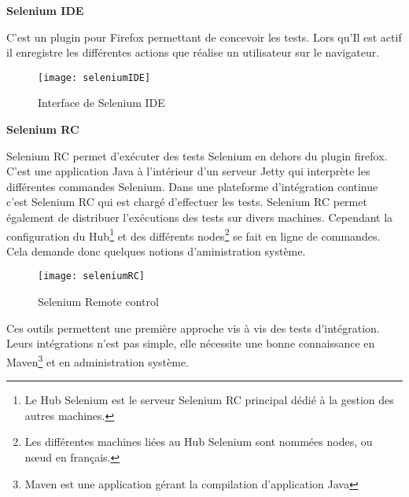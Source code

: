\textbf{Selenium IDE}

		C'est un plugin pour Firefox permettant de concevoir les tests. Lors qu'Il est actif il enregistre
		les différentes actions que réalise un utilisateur sur le navigateur.
		\begin{figure}[!h]
     		\begin{center}
			      \texttt{[image: seleniumIDE]}
			      \caption{Interface de Selenium IDE}
			      \label{seleniumIDE}
		    \end{center}
		\end{figure}		
		

\newpage
\textbf{Selenium RC}

		Selenium RC permet d'exécuter des tests Selenium en dehors du plugin firefox. C'est une
		application Java à l'intérieur d'un serveur Jetty qui interprète les différentes commandes Selenium.
		Dans une plateforme d'intégration continue c'est Selenium RC qui est chargé d'effectuer les tests.
		Selenium RC permet également de distribuer l'exécutions des tests sur divers machines. Cependant
		la configuration du Hub\footnote{Le Hub Selenium est le serveur Selenium RC principal dédié à la gestion
		des autres machines.} et des différents nodes\footnote{Les différentes machines liées au Hub Selenium sont
		nommées nodes, ou nœud en français.} se fait en ligne de commandes. Cela demande donc quelques notions
		d'aministration système.
		\begin{figure}[!h]
     		\begin{center}
			      \texttt{[image: seleniumRC]}
			      \caption{Selenium Remote control}
			      \label{seleniumRC}
		    \end{center}
		\end{figure}	

 		


Ces outils permettent une première approche vis à vis des tests d'intégration. Leurs intégrations n'est pas simple, elle nécessite une bonne connaissance en Maven\footnote{Maven est une application gérant la compilation d'application Java} et
en administration système. 

